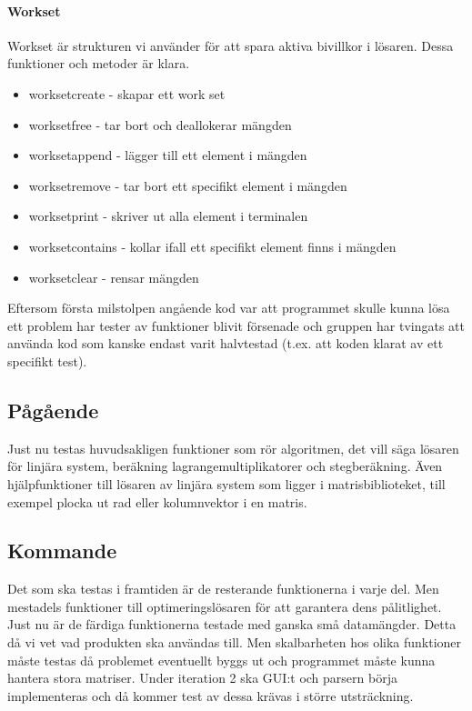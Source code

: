 \paragraph{Work\underline{\space}set}
Work\underline{\space}set är strukturen vi använder för att spara aktiva bivillkor i lösaren. Dessa funktioner och metoder är klara.
\begin{itemize}
\item{work\underline{\space}set\underline{\space}create - skapar ett work set}
\item{work\underline{\space}set\underline{\space}free - tar bort och deallokerar mängden}
\item{work\underline{\space}set\underline{\space}append - lägger till ett element i mängden}
\item{work\underline{\space}set\underline{\space}remove - tar bort ett specifikt element i mängden}
\item{work\underline{\space}set\underline{\space}print - skriver ut alla element i terminalen}
\item{work\underline{\space}set\underline{\space}contains - kollar ifall ett specifikt element finns i mängden}
\item{work\underline{\space}set\underline{\space}clear - rensar mängden}
\end{itemize}

\raggedright Eftersom första milstolpen angående kod var att programmet skulle kunna lösa ett problem har tester av funktioner blivit försenade och gruppen har tvingats att använda kod som kanske endast varit halvtestad (t.ex. att koden klarat av ett specifikt test). 


\newpage
\subsection{Pågående}
Just nu testas huvudsakligen funktioner som rör algoritmen, det vill säga lösaren för linjära system, beräkning lagrangemultiplikatorer och stegberäkning. Även hjälpfunktioner till lösaren av linjära system som ligger i matrisbiblioteket, till exempel plocka ut rad eller kolumnvektor i en matris. 

\subsection{Kommande}
Det som ska testas i framtiden är de resterande funktionerna i varje del. Men mestadels funktioner till optimeringslösaren för att garantera dens pålitlighet. Just nu är de färdiga funktionerna testade med ganska små datamängder. Detta då vi vet vad produkten ska användas till. Men skalbarheten hos olika funktioner måste testas då problemet eventuellt byggs ut och programmet måste kunna hantera stora matriser. Under iteration 2 ska GUI:t och parsern börja implementeras och då kommer test av dessa krävas i större utsträckning.